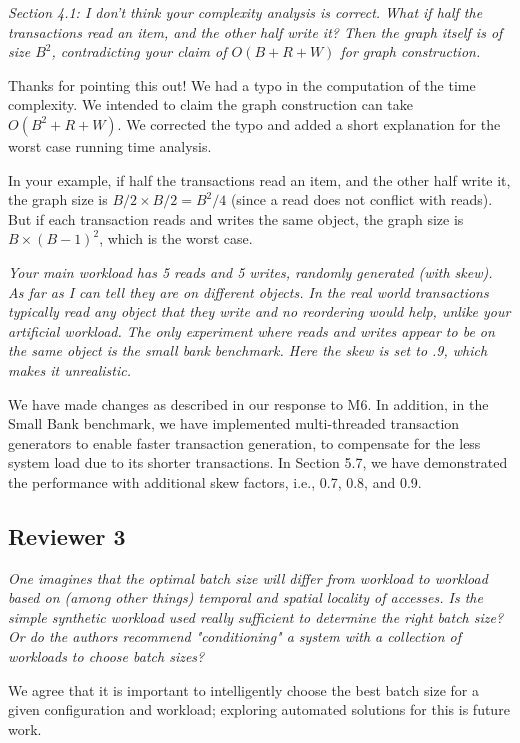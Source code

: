 \documentclass{article}
\begin{document}
\emph{Section 4.1: I don't think your complexity analysis is correct. What if half the transactions read an item, and the other half write it? Then the graph itself is of size $B^2$, contradicting your claim of $O(B+R+W)$ for graph construction.}

Thanks for pointing this out! We had a typo in the computation of the time complexity. We intended to claim the graph construction can take $O(B^2+R+W)$. We corrected the typo and added a short explanation for the worst case running time analysis.

In your example, if half the transactions read an item, and the other half write it, the graph size is $B/2\times B/2=B^2/4$ (since a read does not conflict with reads). But if each transaction reads and writes the same object, the graph size is $B\times (B-1)^2$, which is the worst case.


\emph{Your main workload has 5 reads and 5 writes, randomly generated (with skew). As far as I can tell they are on different objects. In the real world transactions typically read any object that they write and no reordering would help, unlike your artificial workload. The only experiment where reads and writes appear to be on the same object is the small bank benchmark. Here the skew is set to .9, which makes it unrealistic. }

We have made changes as described in our response to M6. In addition, in the Small Bank benchmark, we have implemented multi-threaded transaction generators to enable faster transaction generation, to compensate for the less system load due to its shorter transactions. In Section 5.7, we have demonstrated the performance with additional skew factors, i.e., 0.7, 0.8, and 0.9.

\subsection{Reviewer 3}

\emph{One imagines that the optimal batch size will differ from workload to workload based on (among other things) temporal and spatial locality of accesses. Is the simple synthetic workload used really sufficient to determine the right batch size? Or do the authors recommend "conditioning" a system with a collection of workloads to choose batch sizes?}

We agree that it is important to intelligently choose the best batch size for a given configuration and workload; exploring automated solutions for this is future work.
\end{document}

